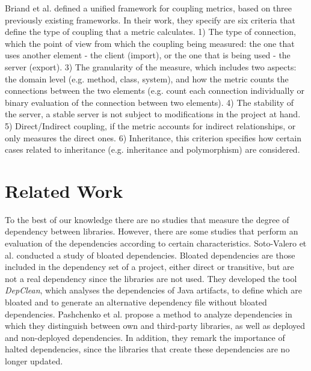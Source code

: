 \documentclass[a4paper]{article}
\begin{document}
Briand et al. \cite{briand1999unified} defined a unified framework for coupling metrics, based on three previously existing frameworks. In their work, they specify are six criteria that define the type of coupling that a metric calculates. 1) The type of connection, which the point of view from which the coupling being measured: the one that uses another element - the client (import), or the one that is being used - the server (export). 3) The granularity of the measure, which includes two aspects: the domain level (e.g. method, class, system), and how the metric counts the connections between the two elements (e.g. count each connection individually or binary evaluation of the connection between two elements). 4) The stability of the server, a stable server is not subject to modifications in the project at hand. 5) Direct/Indirect coupling, if the metric accounts for indirect relationships, or only measures the direct ones. 6) Inheritance, this criterion specifies how certain cases related to inheritance (e.g. inheritance and polymorphism) are considered.

\section{Related Work}
To the best of our knowledge there are no studies that measure the degree of dependency between libraries. However, there are some studies that perform an evaluation of the dependencies according to certain characteristics.
Soto-Valero et al. \cite{soto2020comprehensive} conducted a study of bloated dependencies. Bloated dependencies are those included in the dependency set of a project, either direct or transitive, but are not a real dependency since the libraries are not used. They developed the tool \textit{DepClean}, which analyses the dependencies of Java artifacts, to define which are bloated and to generate an alternative dependency file without bloated dependencies.
Pashchenko et al. \cite{pashchenko2018vulnerable} propose a method to analyze dependencies in which they distinguish between own and third-party libraries, as well as deployed and non-deployed dependencies. In addition, they remark the importance of halted dependencies, since the libraries that create these dependencies are no longer updated.

\end{document}
